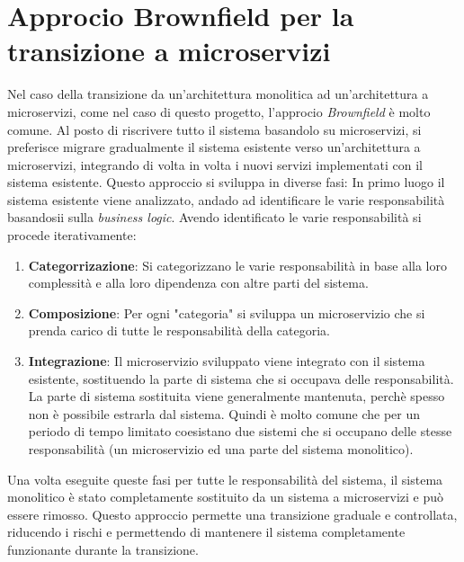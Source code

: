 \section{Approcio Brownfield per la transizione a microservizi}
\label{sec:brownfield_microservices}
Nel caso della transizione da un'architettura monolitica ad un'architettura a microservizi, come nel caso di questo progetto, l'approcio \textit{Brownfield} è molto comune.
Al posto di riscrivere tutto il sistema basandolo su microservizi, si preferisce migrare gradualmente il sistema esistente verso un'architettura a microservizi,
integrando di volta in volta i nuovi servizi implementati con il sistema esistente.
Questo approccio si sviluppa in diverse fasi:
In primo luogo il sistema esistente viene analizzato, andado ad identificare le varie responsabilità basandosii sulla \textit{business logic}.
Avendo identificato le varie responsabilità si procede iterativamente:
\begin{enumerate}
    \item \textbf{Categorrizazione}: Si categorizzano le varie responsabilità in base alla loro complessità e alla loro dipendenza con altre parti del sistema.
    \item \textbf{Composizione}: Per ogni "categoria" si sviluppa un microservizio che si prenda carico di tutte le responsabilità della categoria.
    \item \textbf{Integrazione}: Il microservizio sviluppato viene integrato con il sistema esistente, sostituendo la parte di sistema che si occupava delle responsabilità.
    La parte di sistema sostituita viene generalmente mantenuta, perchè spesso non è possibile estrarla dal sistema. Quindi è molto comune che per un periodo di tempo
    limitato coesistano due sistemi che si occupano delle stesse responsabilità (un microservizio ed una parte del sistema monolitico).
\end{enumerate}
Una volta eseguite queste fasi per tutte le responsabilità del sistema, il sistema monolitico è stato completamente sostituito da un sistema a microservizi e può essere rimosso.
Questo approccio permette una transizione graduale e controllata, riducendo i rischi e permettendo di mantenere il sistema completamente funzionante durante la transizione.
